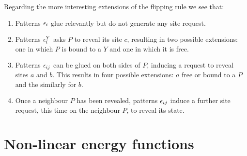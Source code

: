 Regarding the more interesting extensions of the flipping rule %
we see that:
\begin{enumerate}[label={(\roman*)}]
\item Patterns $\epsilon_i$ glue relevantly
  but do not generate any site request.
\item Patterns $\epsilon^Y_i$ asks $P$ to reveal its site $c$,
  resulting in two possible extensions:
  one in which $P$ is bound to a $Y$ and one in which it is free.
\item Patterns $\epsilon_{ij}$ can be glued on both sides of $P$,
  inducing a request to reveal sites $a$ and $b$.
  This results in four possible extensions:
  $a$ free or bound to a $P$ and the similarly for $b$.
\item Once a neighbour $P$ has been revealed,
  patterns $\epsilon_{ij}$ induce a further site request,
  this time on the neighbour $P$, to reveal its state.
\end{enumerate}



\section{Non-linear energy functions}
\label{sec:non-linear-energy}

